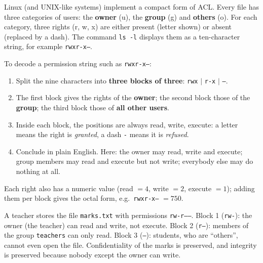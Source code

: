 \documentclass[11pt]{article}
\begin{document}
Linux (and UNIX-like systems) implement a compact form of ACL. Every file has three categories of users: the \textbf{owner} (u), the \textbf{group} (g) and \textbf{others} (o). For each category, three rights (r, w, x) are either present (letter shown) or absent (replaced by a dash). The command \texttt{ls -l} displays them as a ten-character string, for example \texttt{rwxr-x---}.

\begin{methode}
To decode a permission string such as \texttt{rwxr-x---}:
\begin{enumerate}
\item Split the nine characters into \textbf{three blocks of three}: \texttt{rwx} $\mid$ \texttt{r-x} $\mid$ \texttt{---}.
\item The first block gives the rights of the \textbf{owner}; the second block those of the \textbf{group}; the third block those of \textbf{all other users}.
\item Inside each block, the positions are always read, write, execute: a letter means the right is \emph{granted}, a dash \texttt{-} means it is \emph{refused}.
\item Conclude in plain English. Here: the owner may read, write and execute; group members may read and execute but not write; everybody else may do nothing at all.
\end{enumerate}
Each right also has a numeric value (read $=4$, write $=2$, execute $=1$); adding them per block gives the octal form, e.g.\ \texttt{rwxr-x---} $=750$.
\end{methode}

\begin{exemplebox}
A teacher stores the file \texttt{marks.txt} with permissions \texttt{rw-r-----}. Block 1 (\texttt{rw-}): the owner (the teacher) can read and write, not execute. Block 2 (\texttt{r--}): members of the group \texttt{teachers} can only read. Block 3 (\texttt{---}): students, who are ``others'', cannot even open the file. Confidentiality of the marks is preserved, and integrity is preserved because nobody except the owner can write.
\end{exemplebox}
\end{document}
